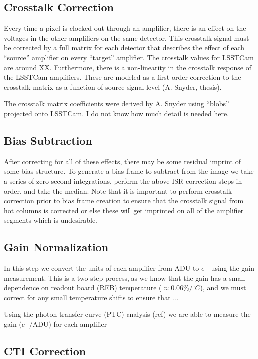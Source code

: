 \documentclass[SE,authoryear,lsstdraft,toc]{lsstdoc}
\newcommand{\etron}{e^{-}}
\begin{document}
\subsection{Crosstalk Correction}

Every time a pixel is clocked out through an amplifier, there is an effect on
the voltages in the other amplifiers on the same detector.  This crosstalk
signal must be corrected by a full matrix for each detector that describes the
effect of each ``source'' amplifier on every ``target'' amplifier.  The
crosstalk values for LSSTCam are around XX.  Furthermore, there is a
non-linearity in the crosstalk response of the LSSTCam amplifiers.  These are
modeled as a first-order correction to the crosstalk matrix as a function of
source signal level (A. Snyder, thesis).

The crosstalk matrix coefficients were derived by A. Snyder using ``blobs''
projected onto LSSTCam.  I do not know how much detail is needed here.

\subsection{Bias Subtraction}

After correcting for all of these effects, there may be some residual imprint
of some bias structure.  To generate a bias frame to subtract from the image we
take a series of zero-second integrations, perform the above ISR correction
steps in order, and take the median.  Note that it is important to perform
crosstalk correction prior to bias frame creation to ensure that the crosstalk
signal from hot columns is corrected or else these will get imprinted on all of
the amplifier segments which is undesirable.

\subsection{Gain Normalization}

In this step we convert the units of each amplifier from ADU to $\etron$ using
the gain measurement.  This is a two step process, as we know that the gain has
a small dependence on readout board (REB) temperature ($\approx
0.06\%/{^\circ}C$), and we must correct for any small temperature shifts to
ensure that ...

Using the photon transfer curve (PTC) analysis (ref) we are able to measure the
gain ($\etron/\mathrm{ADU}$) for each amplifier

\subsection{CTI Correction}
\end{document}
